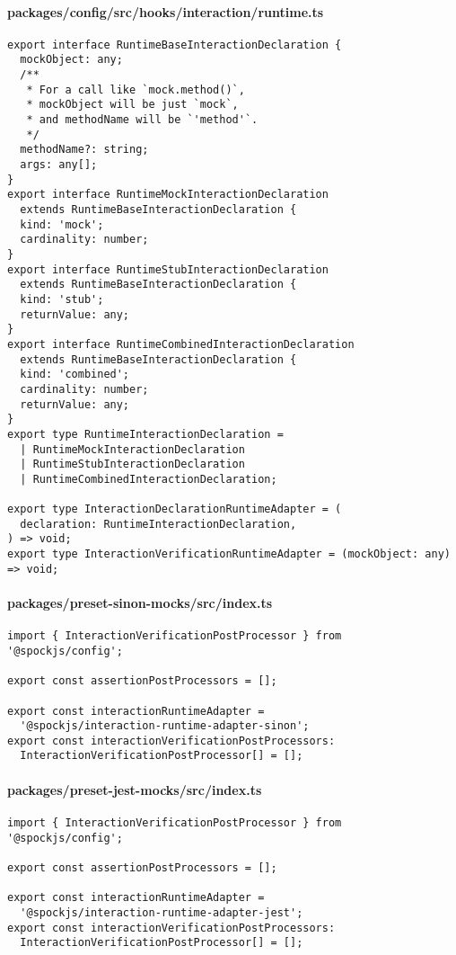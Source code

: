 \paragraph*{packages/config/src/hooks/interaction/runtime.ts}
\begin{verbatim}
export interface RuntimeBaseInteractionDeclaration {
  mockObject: any;
  /**
   * For a call like `mock.method()`,
   * mockObject will be just `mock`,
   * and methodName will be `'method'`.
   */
  methodName?: string;
  args: any[];
}
export interface RuntimeMockInteractionDeclaration
  extends RuntimeBaseInteractionDeclaration {
  kind: 'mock';
  cardinality: number;
}
export interface RuntimeStubInteractionDeclaration
  extends RuntimeBaseInteractionDeclaration {
  kind: 'stub';
  returnValue: any;
}
export interface RuntimeCombinedInteractionDeclaration
  extends RuntimeBaseInteractionDeclaration {
  kind: 'combined';
  cardinality: number;
  returnValue: any;
}
export type RuntimeInteractionDeclaration =
  | RuntimeMockInteractionDeclaration
  | RuntimeStubInteractionDeclaration
  | RuntimeCombinedInteractionDeclaration;

export type InteractionDeclarationRuntimeAdapter = (
  declaration: RuntimeInteractionDeclaration,
) => void;
export type InteractionVerificationRuntimeAdapter = (mockObject: any) => void;
\end{verbatim}

\paragraph*{packages/preset-sinon-mocks/src/index.ts}
\begin{verbatim}
import { InteractionVerificationPostProcessor } from '@spockjs/config';

export const assertionPostProcessors = [];

export const interactionRuntimeAdapter =
  '@spockjs/interaction-runtime-adapter-sinon';
export const interactionVerificationPostProcessors:
  InteractionVerificationPostProcessor[] = [];
\end{verbatim}

\paragraph*{packages/preset-jest-mocks/src/index.ts}
\begin{verbatim}
import { InteractionVerificationPostProcessor } from '@spockjs/config';

export const assertionPostProcessors = [];

export const interactionRuntimeAdapter =
  '@spockjs/interaction-runtime-adapter-jest';
export const interactionVerificationPostProcessors:
  InteractionVerificationPostProcessor[] = [];
\end{verbatim}

